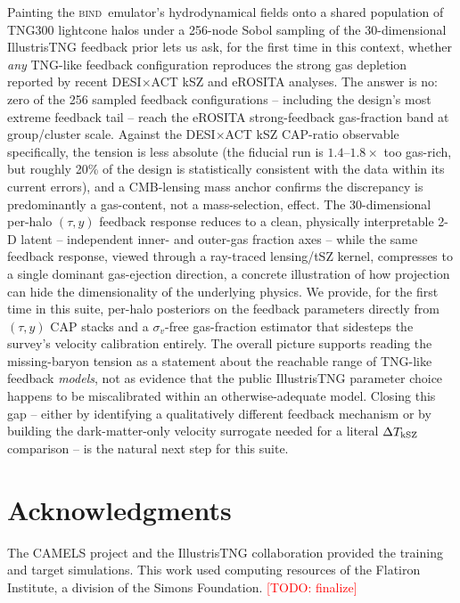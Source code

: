 \documentclass[11pt]{article}
\newcommand{\bind}{\textsc{bind}}
\newcommand{\todo}[1]{\textcolor{red}{[TODO: #1]}}
\begin{document}
Painting the \bind\ emulator's hydrodynamical fields onto a shared population
of TNG300 lightcone halos under a 256-node Sobol sampling of the
30-dimensional IllustrisTNG feedback prior lets us ask, for the first time in
this context, whether \emph{any} TNG-like feedback configuration reproduces
the strong gas depletion reported by recent DESI$\times$ACT kSZ and eROSITA
analyses. The answer is no: zero of the 256 sampled feedback configurations --
including the design's most extreme feedback tail -- reach the eROSITA
strong-feedback gas-fraction band at group/cluster scale. Against the
DESI$\times$ACT kSZ CAP-ratio observable specifically, the tension is less
absolute (the fiducial run is $1.4$--$1.8\times$ too gas-rich, but roughly 20\%
of the design is statistically consistent with the data within its current
errors), and a CMB-lensing mass anchor confirms the discrepancy is
predominantly a gas-content, not a mass-selection, effect. The 30-dimensional
per-halo $(\tau,y)$ feedback response reduces to a clean, physically
interpretable 2-D latent -- independent inner- and outer-gas fraction axes --
while the same feedback response, viewed through a ray-traced lensing/tSZ
kernel, compresses to a single dominant gas-ejection direction, a concrete
illustration of how projection can hide the dimensionality of the underlying
physics. We provide, for the first time in this suite, per-halo posteriors on
the feedback parameters directly from $(\tau,y)$ CAP stacks and a
$\sigma_v$-free gas-fraction estimator that sidesteps the survey's velocity
calibration entirely. The overall picture supports reading the missing-baryon
tension as a statement about the reachable range of TNG-like feedback
\emph{models}, not as evidence that the public IllustrisTNG parameter choice
happens to be miscalibrated within an otherwise-adequate model. Closing this
gap -- either by identifying a qualitatively different feedback mechanism or
by building the dark-matter-only velocity surrogate needed for a literal
$\Delta T_{\rm kSZ}$ comparison -- is the natural next step for this
suite.

\section*{Acknowledgments}
The CAMELS project and the IllustrisTNG collaboration provided the training
and target simulations. This work used computing resources of the Flatiron
Institute, a division of the Simons Foundation. \todo{finalize}



\end{document}
